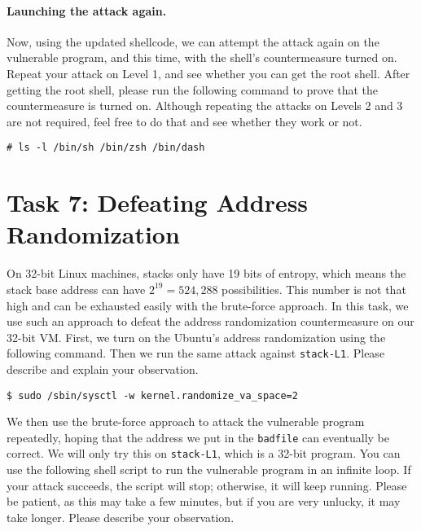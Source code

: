 \paragraph{Launching the attack again.}
Now, using the updated shellcode, we can attempt the attack 
again on the vulnerable program, and this time, with the 
shell's countermeasure turned on. Repeat your attack
on Level 1, and see whether 
you can get the root shell. After getting the root shell,
please run the following command to prove that the countermeasure
is turned on. Although repeating the attacks on Levels 2 and 3 
are not required, feel free to do that and see whether they work or not.

\begin{lstlisting}
# ls -l /bin/sh /bin/zsh /bin/dash
\end{lstlisting}
 


\section{Task 7: Defeating Address Randomization}

On 32-bit Linux machines, stacks only have 19 bits of entropy, which means the stack base
address can have $2^{19} = 524,288$ possibilities.  This number is not that high and can be
exhausted easily with the brute-force approach. In this task,
we use such an approach to defeat the address randomization countermeasure 
on our 32-bit VM. 
First, we turn on the Ubuntu's address randomization using the 
following command. Then we run the same attack
against \texttt{stack-L1}.
Please describe and explain your observation.

\begin{lstlisting}
$ sudo /sbin/sysctl -w kernel.randomize_va_space=2
\end{lstlisting}


We then use the brute-force approach to attack the vulnerable program repeatedly, hoping that 
the address we put in the \texttt{badfile} can eventually be correct. We will only try
this on \texttt{stack-L1}, which is a 32-bit program. 
You can use the following shell script to run the vulnerable program in an infinite loop. If your
attack succeeds, the script will stop; otherwise, it will keep running. Please be patient,
as this may take a few minutes, but if you are very unlucky,
it may take longer. Please describe your observation.


